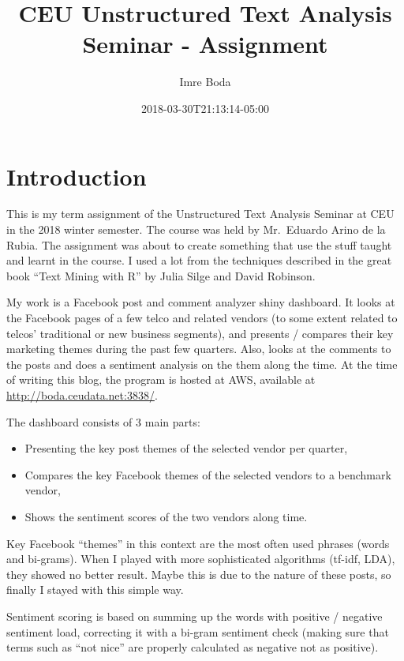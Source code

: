 \documentclass[]{article}
\title{CEU Unstructured Text Analysis Seminar - Assignment}
\author{Imre Boda}
\date{2018-03-30T21:13:14-05:00}
\providecommand{\tightlist}{%
  \setlength{\itemsep}{0pt}\setlength{\parskip}{0pt}}
\begin{document}
\maketitle

\section{Introduction}\label{introduction}

This is my term assignment of the Unstructured Text Analysis Seminar at
CEU in the 2018 winter semester. The course was held by Mr.~Eduardo
Arino de la Rubia. The assignment was about to create something that use
the stuff taught and learnt in the course. I used a lot from the
techniques described in the great book ``Text Mining with R'' by Julia
Silge and David Robinson.

My work is a Facebook post and comment analyzer shiny dashboard. It
looks at the Facebook pages of a few telco and related vendors (to some
extent related to telcos' traditional or new business segments), and
presents / compares their key marketing themes during the past few
quarters. Also, looks at the comments to the posts and does a sentiment
analysis on the them along the time. At the time of writing this blog,
the program is hosted at AWS, available at
\url{http://boda.ceudata.net:3838/}.

The dashboard consists of 3 main parts:

\begin{itemize}
\tightlist
\item
  Presenting the key post themes of the selected vendor per quarter,
\item
  Compares the key Facebook themes of the selected vendors to a
  benchmark vendor,
\item
  Shows the sentiment scores of the two vendors along time.
\end{itemize}

Key Facebook ``themes'' in this context are the most often used phrases
(words and bi-grams). When I played with more sophisticated algorithms
(tf-idf, LDA), they showed no better result. Maybe this is due to the
nature of these posts, so finally I stayed with this simple way.

Sentiment scoring is based on summing up the words with positive /
negative sentiment load, correcting it with a bi-gram sentiment check
(making sure that terms such as ``not nice'' are properly calculated as
negative not as positive).
\end{document}
